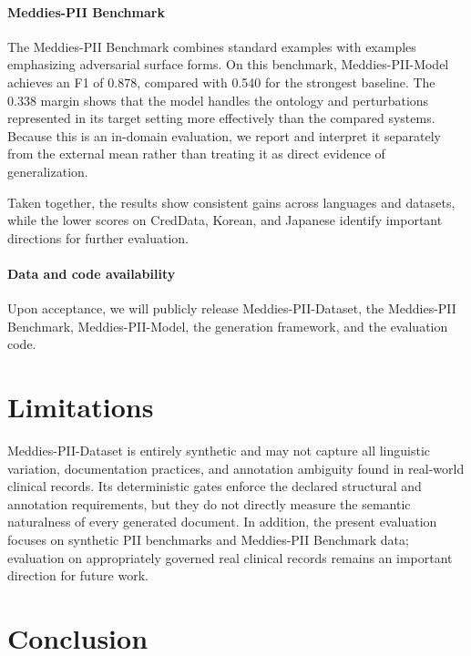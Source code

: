 \documentclass[11pt]{article}
\begin{document}
\paragraph{Meddies-PII Benchmark} The Meddies-PII Benchmark combines standard examples with examples emphasizing adversarial surface forms. On this benchmark, Meddies-PII-Model achieves an F1 of 0.878, compared with 0.540 for the strongest baseline. The 0.338 margin shows that the model handles the ontology and perturbations represented in its target setting more effectively than the compared systems. Because this is an in-domain evaluation, we report and interpret it separately from the external mean rather than treating it as direct evidence of generalization.

Taken together, the results show consistent gains across languages and datasets, while the lower scores on CredData, Korean, and Japanese identify important directions for further evaluation.

\paragraph{Data and code availability} Upon acceptance, we will publicly release Meddies-PII-Dataset, the Meddies-PII Benchmark, Meddies-PII-Model, the generation framework, and the evaluation code.

\section{Limitations}

Meddies-PII-Dataset is entirely synthetic and may not capture all linguistic variation, documentation practices, and annotation ambiguity found in real-world clinical records. Its deterministic gates enforce the declared structural and annotation requirements, but they do not directly measure the semantic naturalness of every generated document. In addition, the present evaluation focuses on synthetic PII benchmarks and Meddies-PII Benchmark data; evaluation on appropriately governed real clinical records remains an important direction for future work.

\section{Conclusion}
\end{document}
